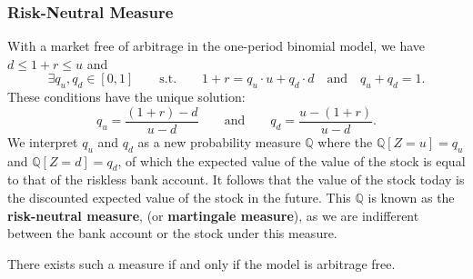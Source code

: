 \subsubsection{Risk-Neutral Measure}
With a market free of arbitrage in the one-period binomial model, we have $d\le 1+r\le u$ and
\[\exists q_u,q_d\in [0,1]\qquad \text{s.t.}\qquad 1+r=q_u\cdot u+q_d\cdot d\quad \text{and}\quad q_u+q_d=1.\] 
These conditions have the unique solution:
\[q_u=\frac{(1+r)-d}{u-d}\qquad\text{and}\qquad q_d=\frac{u-(1+r)}{u-d}.\]
We interpret $q_u$ and $q_d$ as a new probability measure $\mathbb{Q}$ where
the $\mathbb{Q}[Z=u]=q_u$ and $\mathbb{Q}[Z=d]=q_d$, of which the expected
value of the value of the stock is equal to that of the riskless bank account.
It follows that the value of the stock today is the discounted expected value
of the stock in the future.
This $\mathbb{Q}$ is known as the \textbf{risk-neutral measure}, (or
\textbf{martingale measure}), as we are indifferent between the bank account or
the stock under this measure. 
\begin{prop}
  There exists such a measure if and only if the model is arbitrage free.
\end{prop}
